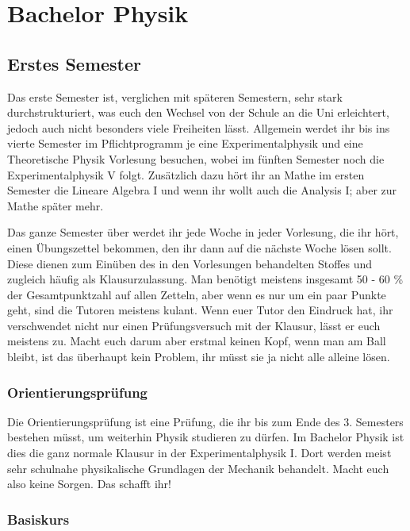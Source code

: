 
\section{Bachelor Physik}

\subsection{Erstes Semester}

Das erste Semester ist, verglichen mit späteren Semestern, sehr stark durchstrukturiert, was euch den Wechsel von der Schule an die Uni erleichtert, jedoch auch nicht besonders viele Freiheiten lässt.  Allgemein werdet ihr bis ins vierte Semester im Pflichtprogramm je eine Experimentalphysik und eine Theoretische Physik Vorlesung besuchen, wobei im fünften Semester noch die Experimentalphysik V folgt. Zusätzlich dazu hört ihr an Mathe im ersten Semester die Lineare Algebra I und wenn ihr wollt auch die Analysis I; aber zur Mathe später mehr.

Das ganze Semester über werdet ihr jede Woche in jeder Vorlesung, die ihr hört, einen Übungszettel bekommen, den ihr dann auf die nächste Woche lösen sollt. Diese dienen zum Einüben des in den Vorlesungen behandelten Stoffes und zugleich häufig als Klausurzulassung. Man benötigt meistens insgesamt 50 - 60 \% der Gesamtpunktzahl auf allen Zetteln, aber wenn es nur um ein paar Punkte geht, sind die Tutoren meistens kulant. Wenn euer Tutor den Eindruck hat, ihr verschwendet nicht nur einen Prüfungsversuch mit der Klausur, lässt er euch meistens zu. Macht euch darum aber erstmal keinen Kopf, wenn man am Ball bleibt, ist das überhaupt kein Problem, ihr müsst sie ja nicht alle alleine lösen.

\subsubsection{Orientierungsprüfung}

Die Orientierungsprüfung ist eine Prüfung, die ihr bis zum Ende des 3. Semesters bestehen müsst, um weiterhin Physik studieren zu dürfen. Im Bachelor Physik ist dies die ganz normale Klausur in der Experimentalphysik I. Dort werden meist sehr schulnahe physikalische Grundlagen der Mechanik behandelt. Macht euch also keine Sorgen. Das schafft ihr!

\subsubsection{Basiskurs}

